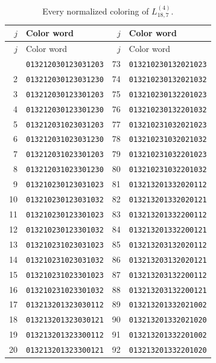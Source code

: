 \documentclass[aps,pra,reprint,superscriptaddress,longbibliography,nofootinbib,floatfix,10pt]{revtex4-2}
\theoremstyle{definition}
\begin{document}
\begin{longtable}{rl@{\qquad}rl}
\caption{Every normalized coloring of $L_{18,7}^{(4)}$.}\label{tab:colors-4d}\\\toprule $j$ & Color word & $j$ & Color word\\\midrule\endfirsthead
\toprule $j$ & Color word & $j$ & Color word\\\midrule\endhead\bottomrule\endfoot
1 & \texttt{013212030123031203} & 73 & \texttt{013210230132021023}\\
2 & \texttt{013212030123031230} & 74 & \texttt{013210230132021032}\\
3 & \texttt{013212030123301203} & 75 & \texttt{013210230132201023}\\
4 & \texttt{013212030123301230} & 76 & \texttt{013210230132201032}\\
5 & \texttt{013212031023031203} & 77 & \texttt{013210231032021023}\\
6 & \texttt{013212031023031230} & 78 & \texttt{013210231032021032}\\
7 & \texttt{013212031023301203} & 79 & \texttt{013210231032201023}\\
8 & \texttt{013212031023301230} & 80 & \texttt{013210231032201032}\\
9 & \texttt{013210230123031023} & 81 & \texttt{013213201332020112}\\
10 & \texttt{013210230123031032} & 82 & \texttt{013213201332020121}\\
11 & \texttt{013210230123301023} & 83 & \texttt{013213201332200112}\\
12 & \texttt{013210230123301032} & 84 & \texttt{013213201332200121}\\
13 & \texttt{013210231023031023} & 85 & \texttt{013213203132020112}\\
14 & \texttt{013210231023031032} & 86 & \texttt{013213203132020121}\\
15 & \texttt{013210231023301023} & 87 & \texttt{013213203132200112}\\
16 & \texttt{013210231023301032} & 88 & \texttt{013213203132200121}\\
17 & \texttt{013213201323030112} & 89 & \texttt{013213201332021002}\\
18 & \texttt{013213201323030121} & 90 & \texttt{013213201332021020}\\
19 & \texttt{013213201323300112} & 91 & \texttt{013213201332201002}\\
20 & \texttt{013213201323300121} & 92 & \texttt{013213201332201020}\\

\end{longtable}
\end{document}
